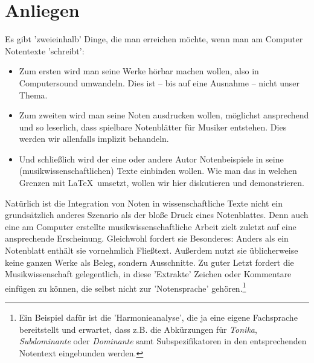 %
%
%



\section{Anliegen}

Es gibt 'zweieinhalb' Dinge, die man erreichen möchte, wenn man am Computer
Notentexte 'schreibt':

\begin{itemize}
  \item Zum ersten wird man seine Werke hörbar machen wollen, also in
  Computersound umwandeln. Dies ist -- bis auf eine Ausnahme -- nicht
  unser Thema.
  \item Zum zweiten wird man seine Noten ausdrucken wollen, möglichst
  ansprechend und so leserlich, dass spielbare Notenblätter für Musiker
  entstehen. Dies werden wir allenfalls implizit behandeln.
  \item Und schließlich wird der eine oder andere Autor Notenbeispiele in seine
  (musikwissenschaftlichen) Texte einbinden wollen. Wie man das in welchen
  Grenzen mit \LaTeX\ umsetzt, wollen wir hier diskutieren und demonstrieren.
\end{itemize}

Natürlich ist die Integration von Noten in wissenschaftliche Texte nicht ein
grundsätzlich anderes Szenario als der bloße Druck eines Notenblattes.
Denn auch eine am Computer erstellte musikwissenschaftliche Arbeit zielt zuletzt
auf eine ansprechende Erscheinung. Gleichwohl fordert sie Besonderes: Anders als
ein Notenblatt enthält sie vornehmlich Fließtext. Außerdem nutzt sie
üblicherweise keine ganzen Werke als Beleg, sondern Ausschnitte. Zu guter Letzt
fordert die Musikwissenschaft gelegentlich, in diese 'Extrakte' Zeichen oder
Kommentare einfügen zu können, die selbst nicht zur 'Notensprache'
gehören.\footnote{Ein Beispiel dafür ist die 'Harmonieanalyse', die ja eine
eigene Fachsprache bereitstellt und erwartet, dass z.B. die Abkürzungen für
\textit{Tonika}, \textit{Subdominante} oder \textit{Dominante} samt
Subspezifikatoren in den entsprechenden Notentext eingebunden werden.}

